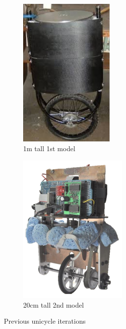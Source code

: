 \documentclass[twoside,twocolumn,12pt]{article}
\begin{document}
\begin{figure}[b!]
  \centering
  \begin{subfigure}[t]{0.325\textwidth}
    \includegraphics[width=\linewidth,height=7.5cm]{first}
   \caption{1m tall 1st model \cite{roderigo}}
  \label{sub:old1}
  \end{subfigure}
  \begin{subfigure}[t]{0.325\textwidth}
    \includegraphics[width=\linewidth,height=7.5cm]{old_unicycle}
    \caption{20cm tall 2nd model \cite{eric}}
  \label{sub:old2}
  \end{subfigure}
  \caption{Previous unicycle iterations}
  \label{fig:unimodels}
\end{figure}
\end{document}
